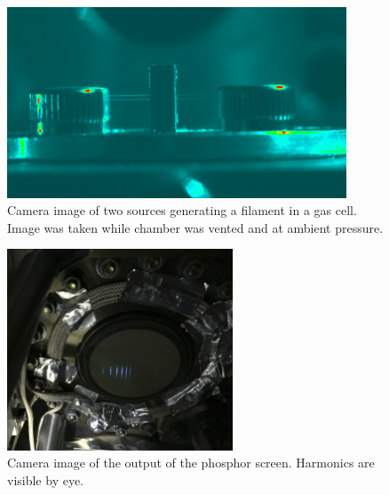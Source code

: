 \begin{figure}
	\centering
	\includegraphics[width=0.9\textwidth]{figures/Two_source/ts_filament_gas_cell.png}
	\caption{Camera image of two sources generating a filament in a gas cell. Image was taken while chamber was vented and at ambient pressure.}
	\label{ts_filament}
\end{figure}


\begin{figure}
	\centering
	\includegraphics[width=0.6\textwidth]{figures/Two_source/MCP_ts_harmonics.png}
	\caption{Camera image of the output of the phosphor screen.  Harmonics are visible by eye.}
	\label{MCP_ts_harmonics}
\end{figure}

